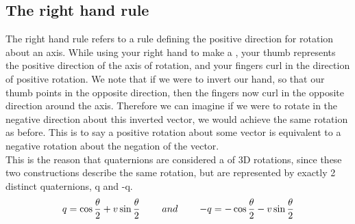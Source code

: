 \subsection{The right hand rule}
The right hand rule refers to a rule defining the positive direction for rotation about an axis. While using your right hand to make a , your thumb represents the positive direction of the axis of rotation, and your fingers curl in the direction of positive rotation.
We note that if we were to invert our hand, so that our thumb points in the opposite direction, then the fingers now curl in the opposite direction around the axis. Therefore we can imagine if we were to rotate in the negative direction about this inverted vector, we would achieve the same rotation as before. This is to say a positive rotation about some vector is equivalent to a negative rotation about the negation of the vector.\\
This is the reason that quaternions are considered a  of 3D rotations, since these two constructions describe the same rotation, but are represented by exactly 2 distinct quaternions, q and -q.
$$ q = \cos{\frac{\theta}{2}} + v\sin{\frac{\theta}{2}} \operatorname{\operatorname{\: \: \: \:} \operatorname{\: \: \: \:}} and \operatorname{\operatorname{\: \: \: \:} \operatorname{\: \: \: \:}} -q = -\cos{\frac{\theta}{2}} - v\sin{\frac{\theta}{2}}$$






